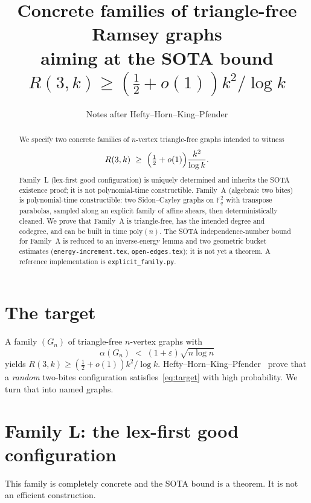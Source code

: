 \documentclass[11pt]{article}
\title{Concrete families of triangle-free Ramsey graphs\\
aiming at the SOTA bound $R(3,k)\ge(\tfrac12+o(1))k^{2}/\log k$}
\author{Notes after Hefty--Horn--King--Pfender}
\date{}
\theoremstyle{definition}
\newcommand{\F}{\mathbb{F}}
\newcommand{\eps}{\varepsilon}
\begin{document}
\maketitle

\begin{abstract}
We specify two concrete families of $n$-vertex triangle-free graphs intended to witness
\[
  R(3,k)\;\ge\;\Bigl(\tfrac12+o(1)\Bigr)\frac{k^{2}}{\log k}.
\]
Family~L (lex-first good configuration) is uniquely determined and inherits the SOTA existence proof; it is not polynomial-time constructible.
Family~A (algebraic two bites) is polynomial-time constructible: two Sidon--Cayley graphs on $\F_q^{2}$ with transpose parabolas, sampled along an explicit family of affine shears, then deterministically cleaned.
We prove that Family~A is triangle-free, has the intended degree and codegree, and can be built in time $\mathrm{poly}(n)$.
The SOTA independence-number bound for Family~A is reduced to an inverse-energy lemma and two geometric bucket estimates (\texttt{energy-increment.tex}, \texttt{open-edges.tex}); it is not yet a theorem.
A reference implementation is \texttt{explicit\_family.py}.
\end{abstract}

\section{The target}

A family $(G_n)$ of triangle-free $n$-vertex graphs with
\begin{equation}\label{eq:target}
  \alpha(G_n)\;<\;(1+\eps)\sqrt{n\log n}
\end{equation}
yields $R(3,k)\ge(\tfrac12+o(1))k^{2}/\log k$.
Hefty--Horn--King--Pfender~\cite{HHKP2025} prove that a \emph{random} two-bites configuration satisfies~\eqref{eq:target} with high probability.
We turn that into named graphs.

\section{Family L: the lex-first good configuration}

This family is completely concrete and the SOTA bound is a theorem.
It is not an efficient construction.
\end{document}
